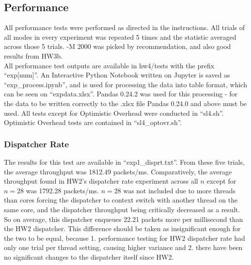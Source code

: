 \documentclass{article}
\begin{document}
\begin{adjustwidth}{-2cm}{-2cm}
\subsection{Performance}
All performance tests were performed as directed in the instructions. All trials of all modes in every experiment was repeated 5 times and the statistic averaged across those 5 trials. -M 2000 was picked by recommendation, and also good results from HW3b.\\
All performance test outputs are available in hw4/tests with the prefix ``exp[num]''. An Interactive Python Notebook written on Jupyter is saved as ``exp\_process.ipynb'', and is used for processing the data into table format, which can be seen on ``expdata.xlsx''. Pandas 0.24.2 was used for this processing - for the data to be written correctly to the .xlsx file Pandas 0.24.0 and above must be used. All tests except for Optimistic Overhead were conducted in ``sl4.sh''. Optimistic Overhead tests are contained in ``sl4\_optovr.sh''.
\subsubsection{Dispatcher Rate}
The results for this test are available in ``exp1\_disprt.txt''. From these five trials, the average throughput was 1812.49 packets/ms. Comparatively, the average throughput found in HW2's dispatcher rate experiment across all $n$ except for $n = 28$ was 1792.28 packets/ms. $n=28$ was not included due to more threads than cores forcing the dispatcher to context switch with another thread on the same core, and the dispatcher throughput being critically decreased as a result. So on average, this dispatcher enqueues 22.21 packets more per millisecond than the HW2 dispatcher. This difference should be taken as insignificant enough for the two to be equal, because 1. performance testing for HW2 dispatcher rate had only one trial per thread setting, causing higher variance and 2. there have been no significant changes to the dispatcher itself since HW2.

\end{adjustwidth}
\end{document}
